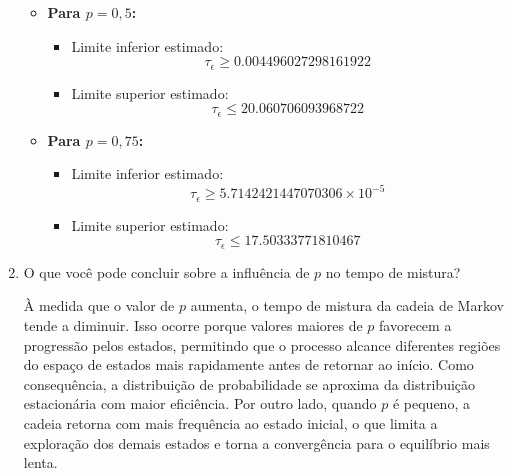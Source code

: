 \begin{enumerate}
\begin{resposta}
\begin{itemize}
            \item \textbf{Para $p = 0{,}5$:}
            \begin{itemize}
                \item Limite inferior estimado:
                $$ \tau_\epsilon \geq 0.004496027298161922 $$
                \item Limite superior estimado:
                $$ \tau_\epsilon \leq 20.060706093968722 $$
            \end{itemize}
        
            \item \textbf{Para $p = 0{,}75$:}
            \begin{itemize}
                \item Limite inferior estimado:
                $$ \tau_\epsilon \geq 5.7142421447070306 \times 10^{-5} $$
                \item Limite superior estimado:
                $$ \tau_\epsilon \leq 17.50333771810467 $$
            \end{itemize}
        \end{itemize}
    \end{resposta}

    \item O que você pode concluir sobre a influência de $p$ no tempo de mistura?
    \begin{resposta}
        À medida que o valor de $p$ aumenta, o tempo de mistura da cadeia de Markov tende a diminuir. Isso ocorre porque valores maiores de $p$ favorecem a progressão pelos estados, permitindo que o processo alcance diferentes regiões do espaço de estados mais rapidamente antes de retornar ao início. Como consequência, a distribuição de probabilidade se aproxima da distribuição estacionária com maior eficiência. Por outro lado, quando $p$ é pequeno, a cadeia retorna com mais frequência ao estado inicial, o que limita a exploração dos demais estados e torna a convergência para o equilíbrio mais lenta.

    \end{resposta}
\end{enumerate}

